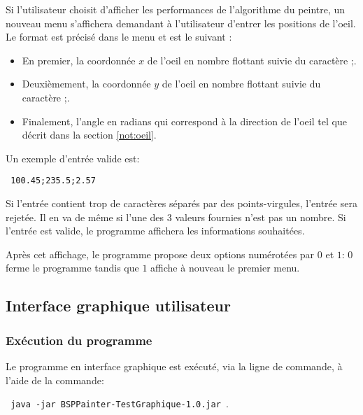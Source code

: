 Si l'utilisateur choisit d'afficher les performances de l'algorithme
du peintre, un nouveau menu s'affichera demandant à l'utilisateur
d'entrer les positions de l'oeil. Le format est précisé
dans le menu et est le suivant :
\begin{itemize}
\item En premier, la coordonnée $x$ de l'oeil en nombre
  flottant suivie du caractère \og;\fg{}.
\item Deuxièmement, la coordonnée $y$ de l'oeil en
  nombre flottant suivie du caractère \og;\fg.
\item Finalement, l'angle en radians qui correspond à la direction
  de l'oeil tel que décrit dans la section \ref{not:oeil}.
\end{itemize}
Un exemple d'entrée valide est:
\begin{center}
  \texttt{
    100.45;235.5;2.57
  }
\end{center}

Si l'entrée contient trop de caractères séparés par des points-virgules,
l'entrée sera rejetée. Il en va de même si l'une des 3 valeurs fournies
n'est pas un nombre. Si l'entrée est valide,
le programme affichera les informations souhaitées.

Après cet affichage, le programme propose deux options numérotées par
$0$ et $1$: $0$ ferme le programme tandis que $1$ affiche à nouveau
le premier menu.

\subsection{Interface graphique utilisateur}
\subsubsection*{Exécution du programme}
Le programme en interface graphique est exécuté, via la ligne de commande,
à l'aide de la commande:
\begin{center}
  \texttt{
    java -jar BSPPainter-TestGraphique-1.0.jar
  }.
\end{center}
